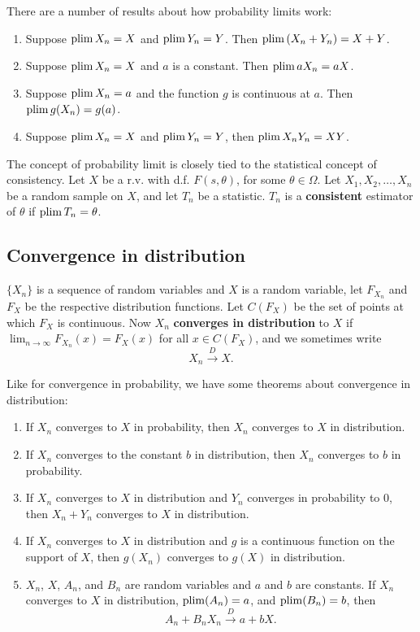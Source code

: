 \documentclass[twoside]{article}
\begin{document}
There are a number of results about how probability limits work:
\begin{enumerate}
\item Suppose $\operatorname{plim} X_n=X$ and $\operatorname{plim} Y_n=Y$. Then $\operatorname{plim} \left(X_n+Y_n\right) = X+Y$.
\item Suppose $\operatorname{plim} X_n=X$ and $a$ is a constant. Then $\operatorname{plim} a X_n = aX$.
\item Suppose $\operatorname{plim} X_n=a$ and the function $g$ is continuous at $a$. Then $\operatorname{plim} g(X_n)=g(a)$.
\item Suppose $\operatorname{plim} X_n=X$ and $\operatorname{plim} Y_n=Y$, then $\operatorname{plim} X_nY_n=XY$.
\end{enumerate}

The concept of probability limit is closely tied to the statistical concept
of consistency. Let $X$ be a r.v. with d.f. $F(s,\theta)$, for some $\theta\in\Omega$.
Let $X_1,X_2,\dots,X_n$ be a random sample on $X$, and let $T_n$ be a statistic.
$T_n$ is a \textbf{consistent} estimator of $\theta$ if $\operatorname{plim} T_n = \theta$.

\subsection{Convergence in distribution}
$\{X_n\}$ is a sequence of random variables and $X$ is a random variable,
let $F_{X_n}$ and $F_X$ be the respective distribution functions. Let 
$C(F_X)$ be the set of points at which $F_X$ is continuous. Now $X_n$ \textbf{converges in
distribution} to $X$ if $\lim_{n\rightarrow\infty} F_{X_n}(x) = F_X(x)$ for all
$x\in C(F_X)$, and we sometimes write \[X_n \xrightarrow{D} X.\]

Like for convergence in probability, we have some theorems about convergence in distribution:

\begin{enumerate}
\item If $X_n$ converges to $X$ in probability, then $X_n$ converges to $X$ in distribution.
\item If $X_n$ converges to the constant $b$ in distribution, then $X_n$
converges to $b$ in probability.
\item If $X_n$ converges to $X$ in distribution and $Y_n$ converges in probability to $0$,
then $X_n+Y_n$ converges to $X$ in distribution.
\item If $X_n$ converges to $X$ in distribution and $g$ is a continuous function on the support
of $X$, then $g(X_n)$ converges to $g(X)$ in distribution.
\item $X_n$, $X$, $A_n$, and $B_n$ are random variables and $a$ and $b$ are constants. 
If $X_n$ converges to $X$ in distribution, $\operatorname{plim}(A_n)=a$, and $\operatorname{plim}(B_n)=b$, then
\[ A_n + B_n X_n \xrightarrow{D} a + bX.\]
\end{enumerate}
\end{document}
